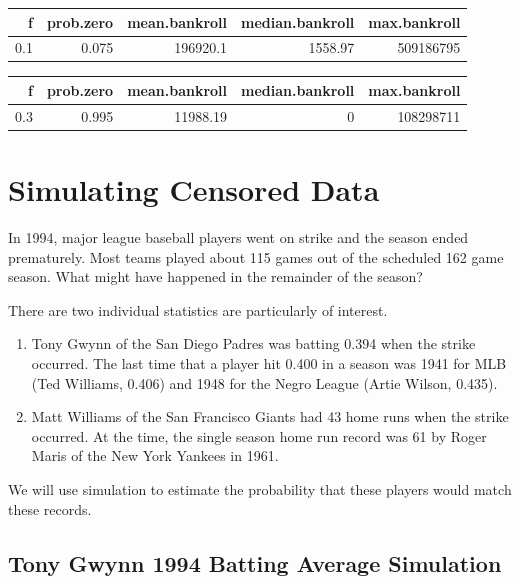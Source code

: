 \documentclass[
  11pt,
]{book}
\theoremstyle{definition}
\theoremstyle{definition}
\theoremstyle{definition}
\theoremstyle{definition}
\theoremstyle{remark}
\begin{document}
\begin{table}[H]
\centering
\begin{tabular}{rrrrr}
\toprule
f & prob.zero & mean.bankroll & median.bankroll & max.bankroll\\
\midrule
0.1 & 0.075 & 196920.1 & 1558.97 & 509186795\\
\bottomrule
\end{tabular}
\end{table}

\begin{table}[H]
\centering
\begin{tabular}{rrrrr}
\toprule
f & prob.zero & mean.bankroll & median.bankroll & max.bankroll\\
\midrule
0.3 & 0.995 & 11988.19 & 0 & 108298711\\
\bottomrule
\end{tabular}
\end{table}

\newpage

\hypertarget{simulating-censored-data}{%
\section{Simulating Censored Data}\label{simulating-censored-data}}

In 1994, major league baseball players went on strike and the season ended prematurely. Most teams played about 115 games out of the scheduled 162 game season. What might have happened in the remainder of the season?

There are two individual statistics are particularly of interest.

\begin{enumerate}
\def\labelenumi{\arabic{enumi})}
\item
  Tony Gwynn of the San Diego Padres was batting 0.394 when the strike occurred. The last time that a player hit 0.400 in a season was 1941 for MLB (Ted Williams, 0.406) and 1948 for the Negro League (Artie Wilson, 0.435).
\item
  Matt Williams of the San Francisco Giants had 43 home runs when the strike occurred. At the time, the single season home run record was 61 by Roger Maris of the New York Yankees in 1961.
\end{enumerate}

We will use simulation to estimate the probability that these players would match these records.

\hypertarget{tony-gwynn-1994-batting-average-simulation}{%
\subsection{Tony Gwynn 1994 Batting Average Simulation}\label{tony-gwynn-1994-batting-average-simulation}}
\end{document}
